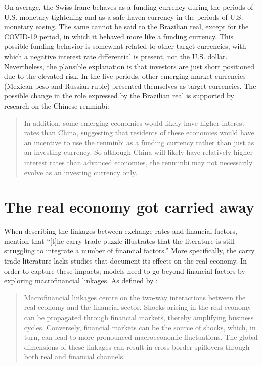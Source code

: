 \documentclass[a4paper, twoside]{templates/ociamthesis}
\begin{document}
On average, the Swiss franc behaves as a funding currency during the periods of U.S. monetary tightening and as a safe haven currency in the periods of U.S. monetary easing. The same cannot be said to the Brazilian real, except for the COVID-19 period, in which it behaved more like a funding currency. This possible funding behavior is somewhat related to other target currencies, with which a negative interest rate differential is present, not the U.S. dollar. Nevertheless, the plausible explanation is that investors are just short positioned due to the elevated risk. In the five periods, other emerging market currencies (Mexican peso and Russian ruble) presented themselves as target currencies. The possible change in the role expressed by the Brazilian real is supported by research on the Chinese renminbi:

\begin{quote}
In addition, some emerging economies would likely have higher interest rates than China, suggesting that residents of these economies would have an incentive to use the renminbi as a funding currency rather than just as an investing currency. So although China will likely have relatively higher interest rates than advanced economies, the renminbi may not necessarily evolve as an investing currency only. \autocite[ 320]{he2016}
\end{quote}

\hypertarget{twofour}{%
\section{The real economy got carried away}\label{twofour}}

\noindent When describing the linkages between exchange rates and financial factors, \textcite[ 49]{claessens2018} mention that ``{[}t{]}he carry trade puzzle illustrates that the literature is still struggling to integrate a number of financial factors.'' More specifically, the carry trade literature lacks studies that document its effects on the real economy. In order to capture these impacts, models need to go beyond financial factors by exploring macrofinancial linkages. As defined by \textcite[ 1]{claessens2018}:

\begin{quote}
Macrofinancial linkages centre on the two-way interactions between the real economy and the financial sector. Shocks arising in the real economy can be propagated through financial markets, thereby amplifying business cycles. Conversely, financial markets can be the source of shocks, which, in turn, can lead to more pronounced macroeconomic fluctuations. The global dimensions of these linkages can result in cross-border spillovers through both real and financial channels.
\end{quote}
\end{document}
